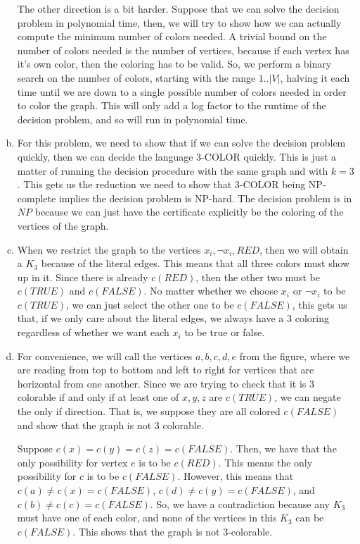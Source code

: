 \documentclass{article}
\begin{document}
\begin{enumerate}[a)]
The other direction is a bit harder. Suppose that we can solve the decision problem in polynomial time, then, we will try to show how we can actually compute the minimum number of colors needed. A trivial bound on the number of colors needed is the number of vertices, because if each vertex has it's own color, then the coloring has to be valid. So, we perform a binary search on the number of colors, starting with the range $1.. |V|$, halving it each time until we are down to a single possible number of colors needed in order to color the graph. This will only add a log factor to the runtime of the decision problem, and so will run in polynomial time.
\item
For this problem, we need to show that if we can solve the decision problem quickly, then we can decide the language 3-COLOR quickly. This is just a matter of running the decision procedure with the same graph and with $k=3$. This gets us the reduction we need to show that 3-COLOR being NP-complete implies the decision problem is NP-hard. The decision problem is in $NP$ because we can just have the certificate explicitly be the coloring of the vertices of the graph.
\item
When we restrict the graph to the vertices $x_i, \neg x_i, RED$, then we will obtain a $K_3$ because of the literal edges. This means that all three colors must show up in it. Since there is already $c(RED)$, then the other two must be $c(TRUE)$ and $c(FALSE)$. No matter whether we choose $x_i$ or $\neg x_i$ to be $c(TRUE)$, we can just select the other one to be $c(FALSE)$, this gets us that, if we only care about the literal edges, we always have a 3 coloring regardless of whether we want each $x_i$ to be true or false.
\item
For convenience, we will call the vertices $a,b,c,d,e$ from the figure, where we are reading from top to bottom and left to right for vertices that are horizontal from one another. Since we are trying to check that it is 3 colorable if and only if at least one of $x,y,z$ are $c(TRUE)$, we can negate the only if direction. That is, we suppose they are all colored $c(FALSE)$ and show that the graph is not 3 colorable.

Suppose $c(x) = c(y) = c(z) = c(FALSE)$. Then, we have that the only possibility for vertex $e$ is to be $c(RED)$. This means the only possibility for $c$ is to be $c(FALSE)$. However, this means that $c(a)\neq c(x) = c(FALSE)$, $c(d)\neq c(y) = c(FALSE)$, and $c(b)\neq c(c) = c(FALSE)$. So, we have a contradiction because any $K_3$ must have one of each color, and none of the vertices in this $K_3$ can be $c(FALSE)$. This shows that the graph is not 3-colorable.


\end{enumerate}
\end{document}
